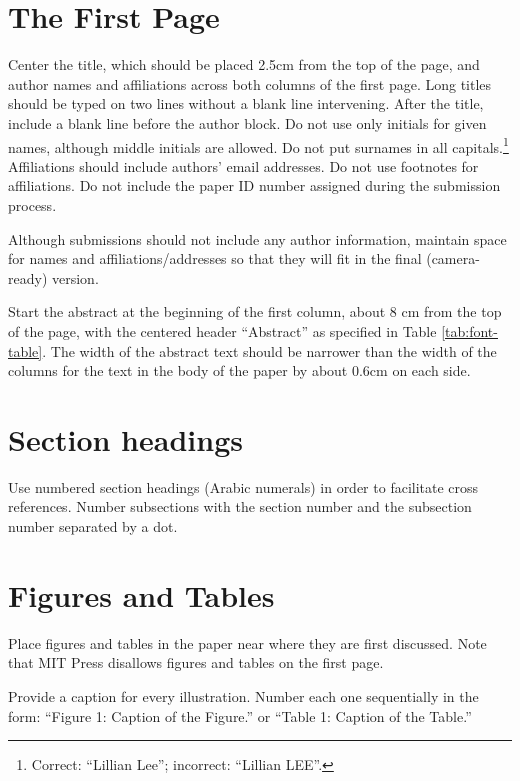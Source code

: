 \documentclass[11pt,a4paper]{article}
\begin{document}
\section{The First Page}
\label{ssec:first}

Center the title, which should be placed 2.5cm from the top of the page,
\iftaclpubformat
and author names and affiliations
\fi
across both columns of the first page. Long titles should be typed on two lines
without a blank line intervening.
\iftaclpubformat
After the title, include a blank line before the author block.
Do not use only initials for given names, although middle initials are allowed.
Do not put surnames in all capitals.\footnote{Correct: ``Lillian Lee'';
incorrect: ``Lillian LEE''.} Affiliations should include authors' email
addresses. Do not use footnotes for affiliations.
\else
Do not include the paper ID number assigned during the submission process.
\fi

\iftaclpubformat
\else
Although submissions should not include any author information, maintain space
for names and affiliations/addresses so that they will fit in the final
(camera-ready)
version.
\fi


Start the abstract at the beginning of the first
column, about 8 cm from the top of the page, with the centered header
``Abstract'' as specified in Table \ref{tab:font-table}.
The width of the abstract text
should be narrower than the width of the columns for the text in the body of the
paper by about 0.6cm on each side.

\section{Section headings}

Use numbered section headings (Arabic numerals) in order to facilitate cross
references. Number subsections with the section number and the subsection number
separated by a dot.



\section{Figures and Tables}

Place figures and tables in the paper near where they are first discussed.
Note that MIT Press disallows figures and tables on the first page.

Provide a caption for every illustration. Number each one
sequentially in the form:  ``Figure 1: Caption of the Figure.'' or ``Table 1:
Caption of the Table.''
\end{document}
